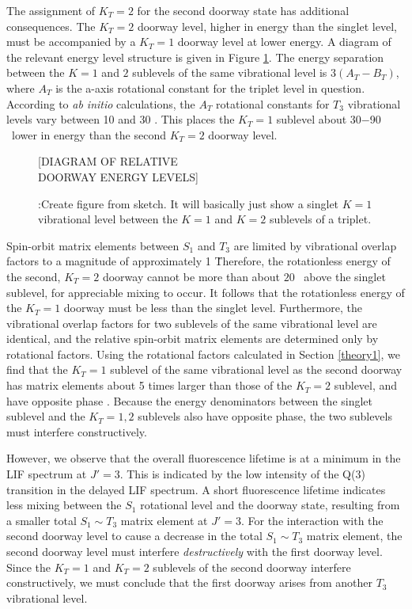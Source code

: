 \documentclass[12pt]{mitthesis}
\begin{document}
The assignment of $K_T=2$ for the second doorway state has additional
consequences.  The $K_T=2$ doorway level, higher in energy than the
singlet level, must be accompanied by a $K_T=1$ doorway level at lower
energy.  A diagram of the relevant energy level structure is given in
Figure \ref{fig:double-doorway-k-levels}. The energy separation
between the $K=1$ and $2$ sublevels of the same vibrational level is
$3(A_T-B_T)$, where $A_T$ is the a-axis rotational constant for the
triplet level in question.  According to \emph{ab initio}
calculations, the $A_T$ rotational constants for $T_3$ vibrational
levels vary between 10 and 30 \rcm \cite{thom07}.  This places the
$K_T=1$ sublevel about 30$-$90 \rcm\ lower in energy than the second
$K_T=2$ doorway level.

\begin{figure}
  \caption{\TODO:{Create figure from sketch.  It will basically just
      show a singlet $K=1$ vibrational level between the $K=1$ and
      $K=2$ sublevels of a triplet.}}
  \label{fig:double-doorway-k-levels}
  \centering

  \vspace{4in}
  [DIAGRAM OF RELATIVE\\ 
   DOORWAY ENERGY LEVELS]
  \vspace{4in}

\end{figure}

Spin-orbit matrix elements between $S_1$ and $T_3$ are limited by
vibrational overlap factors to a magnitude of approximately 1 \rcm\.
Therefore, the rotationless energy of the second, $K_T=2$ doorway
cannot be more than about $20$ \rcm\ above the singlet sublevel, for
appreciable mixing to occur.  It follows that the rotationless energy
of the $K_T=1$ doorway must be less than the singlet level.
Furthermore, the vibrational overlap factors for two sublevels of the
same vibrational level are identical, and the relative spin-orbit
matrix elements are determined only by rotational factors.  Using the
rotational factors calculated in Section \ref{theory1}, we find that
the $K_T=1$ sublevel of the same vibrational level as the second
doorway has matrix elements about 5 times larger than those of the
$K_T=2$ sublevel, and have opposite phase \cite{stevens73}.  Because
the energy denominators between the singlet sublevel and the $K_T=1,2$
sublevels also have opposite phase, the two sublevels must interfere
constructively.

However, we observe that the overall fluorescence lifetime is at a
minimum in the LIF spectrum at $J'=3$.  This is indicated by the low
intensity of the Q(3) transition in the delayed LIF spectrum.  A short
fluorescence lifetime indicates less mixing between the $S_1$
rotational level and the doorway state, resulting from a smaller total
$S_1 \sim T_3$ matrix element at $J'=3$.  For the interaction with the
second doorway level to cause a decrease in the total $S_1 \sim T_3$
matrix element, the second doorway level must interfere
\emph{destructively} with the first doorway level.  Since the $K_T=1$
and $K_T=2$ sublevels of the second doorway interfere constructively,
we must conclude that the first doorway arises from another $T_3$
vibrational level.
\end{document}
